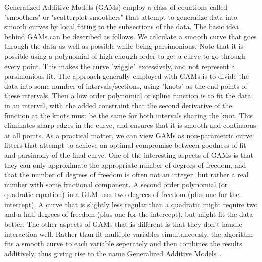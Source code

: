 \documentclass[10pt]{article}
\begin{document}
Generalized Additive Models (GAMs) employ a class of equations called "smoothers" or "scatterplot smoothers" that attempt to generalize data into smooth curves by local fitting to the subsections of the data. The basic idea behind GAMs can be described as follows. We calculate a smooth curve that goes through the data as well as possible while being parsimonious. Note that it is possible using a polynomial of high enough order to get a curve to go through every point. This makes the curve "wiggle" excessively, and not represent a parsimonious fit. The approach generally employed with GAMs is to divide the data into some number of intervals/sections, using "knots" as the end points of these intervals. Then a low order polynomial or spline function is to fit the data in an interval, with the added constraint that the second derivative of the function at the knots must be the same for both intervals sharing the knot. This eliminates sharp edges in the curve, and ensures that it is smooth and continuous at all points. As a practical matter, we can view GAMs as non-parametric curve fitters that attempt to achieve an optimal compromise between goodness-of-fit and parsimony of the final curve. One of the interesting aspects of GAMs is that they can only approximate the appropriate number of degrees of freedom, and that the number of degrees of freedom is often not an integer, but rather a real number with some fractional component. A second order polynomial (or quadratic equation) in a GLM uses two degrees of freedom (plus one for the intercept). A curve that is slightly less regular than a quadratic might require two and a half degrees of freedom (plus one for the intercept), but might fit the data better. The other aspects of GAMs that is different is that they don't handle interaction well. Rather than fit multiple variables simultaneously, the algorithm fits a smooth curve to each variable seperately and then combines the results additively, thus giving rise to the name Generalized Additive Models~\cite{GAM_ref}.
\end{document}

